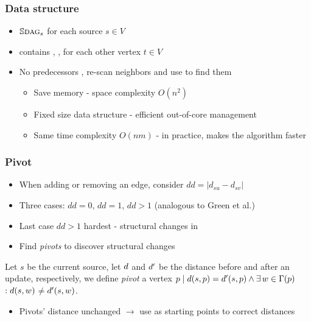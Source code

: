 \begin{frame}
  \frametitle{Data structure}

  \begin{itemize}
    \item $\mathbb{S}\textsc{dag}_s$ for each source $s \in V$
    \item \spdag contains \dist, \paths, \dep for each other vertex $t \in V$
    \item No predecessors \pred, re-scan neighbors and use \dist to find them
      \begin{itemize}
        \item Save memory - space complexity $O(n^2)$
        \item Fixed size data structure - efficient out-of-core management
        \item Same time complexity $O(nm)$ - in practice, makes the algorithm faster
      \end{itemize}
  \end{itemize}

\end{frame}


\begin{frame}
  \frametitle{Pivot}

  \begin{itemize}
    \item When adding or removing an edge, consider $dd = |d_{su} - d_{sv}|$
    \item Three cases: $dd=0$, $dd=1$, $dd>1$ (analogous to Green et al.)
    \item Last case $dd>1$ hardest - structural changes in \spdag
    \item Find \emph{pivots} to discover structural changes
  \end{itemize}

  \begin{definition}[Pivot]
    Let $s$ be the current source, let $d$ and $d'$ be the distance before and after an update, respectively, we define \emph{pivot} a vertex $p \mid d(s,p) = d'(s,p) \wedge \exists \, w \in \Gamma(p)$$: d(s,w)$$\neq$$d'(s,w)$.
  \end{definition}

  \begin{itemize}
    \item Pivots' distance unchanged $\rightarrow$ use as starting points to correct distances
  \end{itemize}

\end{frame}


